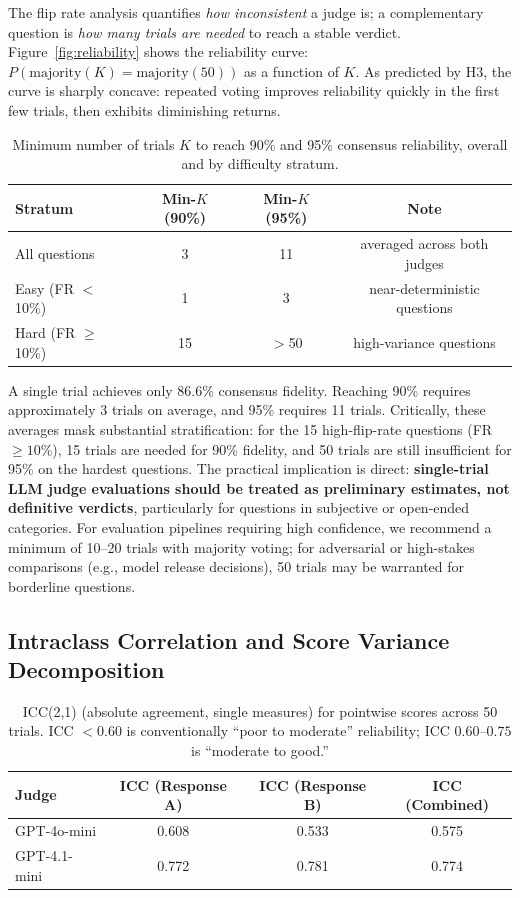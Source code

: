 \documentclass{ijclclp}
\begin{document}
The flip rate analysis quantifies \textit{how inconsistent} a judge is; a complementary question is \textit{how many trials are needed} to reach a stable verdict. Figure~\ref{fig:reliability} shows the reliability curve: $P(\text{majority}(K) = \text{majority}(50))$ as a function of $K$. As predicted by H3, the curve is sharply concave: repeated voting improves reliability quickly in the first few trials, then exhibits diminishing returns.

\begin{table}[h]
\centering
\caption{Minimum number of trials $K$ to reach 90\% and 95\% consensus reliability, overall and by difficulty stratum.}
\label{tab:minn}
\begin{tabular}{lccc}
\toprule
\textbf{Stratum} & \textbf{Min-$K$ (90\%)} & \textbf{Min-$K$ (95\%)} & \textbf{Note} \\
\midrule
All questions    & 3  & 11 & averaged across both judges \\
Easy (FR $<$ 10\%) & 1  & 3  & near-deterministic questions \\
Hard (FR $\geq$ 10\%) & 15 & $>$50 & high-variance questions \\
\bottomrule
\end{tabular}
\end{table}

A single trial achieves only 86.6\% consensus fidelity. Reaching 90\% requires approximately 3 trials on average, and 95\% requires 11 trials. Critically, these averages mask substantial stratification: for the 15 high-flip-rate questions (FR $\geq 10\%$), 15 trials are needed for 90\% fidelity, and 50 trials are still insufficient for 95\% on the hardest questions. The practical implication is direct: \textbf{single-trial LLM judge evaluations should be treated as preliminary estimates, not definitive verdicts}, particularly for questions in subjective or open-ended categories. For evaluation pipelines requiring high confidence, we recommend a minimum of 10--20 trials with majority voting; for adversarial or high-stakes comparisons (e.g., model release decisions), 50 trials may be warranted for borderline questions.

\subsection{Intraclass Correlation and Score Variance Decomposition}
\label{sec:icc}

\begin{table}[h]
\centering
\caption{ICC(2,1) (absolute agreement, single measures) for pointwise scores across 50 trials. ICC $< 0.60$ is conventionally ``poor to moderate'' reliability; ICC $0.60$--$0.75$ is ``moderate to good.''}
\label{tab:icc}
\begin{tabular}{lccc}
\toprule
\textbf{Judge} & \textbf{ICC (Response A)} & \textbf{ICC (Response B)} & \textbf{ICC (Combined)} \\
\midrule
GPT-4o-mini  & 0.608 & 0.533 & 0.575 \\
GPT-4.1-mini & 0.772 & 0.781 & 0.774 \\
\bottomrule
\end{tabular}
\end{table}
\end{document}
